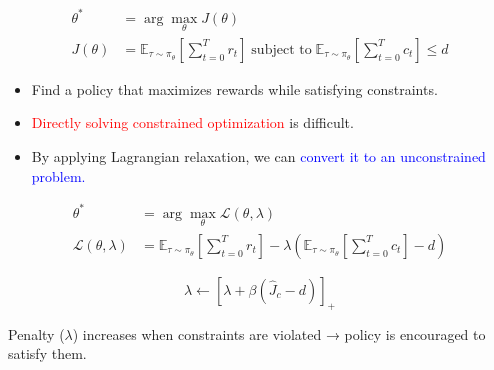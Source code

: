 \documentclass[8pt, aspectratio=169]{beamer} %
\begin{document}
\begin{frame}{\insertsubsectionhead}

  \begin{equation}
    \begin{aligned}
      \theta^* &= \arg\max_\theta J(\theta) \\
      J(\theta) &= \mathbb{E}_{\tau \sim \pi_\theta} \left[ \sum^T_{t = 0} r_t \right] \; \text{subject to} \; \mathbb{E}_{\tau \sim \pi_\theta} \left[ \sum^T_{t = 0} c_t \right] \leq d
    \end{aligned}
  \end{equation}

  \vspace{0.5cm}

  \begin{itemize}
    \item <2-> Find a policy that maximizes rewards while satisfying constraints.
    \item <3-> \textcolor{red}{Directly solving constrained optimization} is difficult.
    \item <4-> By applying Lagrangian relaxation, we can \textcolor{blue}{convert it to an unconstrained problem.}
  \end{itemize}

\end{frame}

\begin{frame}{\insertsubsectionhead}

  \begin{equation}
    \begin{aligned}
      \theta^* &= \arg\max_\theta \mathcal{L}(\theta, \lambda) \\
      \mathcal{L}(\theta, \lambda) &= \mathbb{E}_{\tau \sim \pi_\theta} \left[ \sum^T_{t = 0} r_t \right] - \lambda \left( \mathbb{E}_{\tau \sim \pi_\theta} \left[ \sum^T_{t = 0} c_t \right] - d \right)
    \end{aligned}
  \end{equation}

  \vspace{0.5cm}

  \begin{equation}
    \lambda \leftarrow \left[ \lambda + \beta\left( \hat{J}_c - d \right) \right]_+
  \end{equation}

  \vspace{0.5cm}

  Penalty ($\lambda$) increases when constraints are violated → policy is encouraged to satisfy them.


\end{frame}
\end{document}

